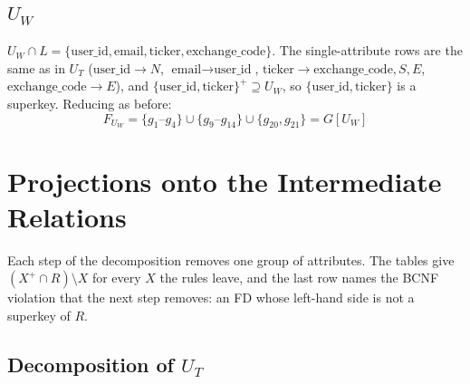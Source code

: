 \documentclass{article}
\newcommand{\at}[1]{\text{#1}}
\newcommand{\cl}[1]{\{#1\}^+}
\newcommand{\gr}[2]{g_{#1}\text{--}g_{#2}}
\begin{document}
\subsection{$U_W$}

$U_W \cap L = \{\at{user\_id}, \at{email}, \at{ticker}, \at{exchange\_code}\}$. The single-attribute rows are the same as in $U_T$ ($\at{user\_id} \rightarrow N$, $\at{email} \rightarrow \at{user\_id}$, $\at{ticker} \rightarrow \at{exchange\_code}, S, E$, $\at{exchange\_code} \rightarrow E$), and $\cl{\at{user\_id}, \at{ticker}} \supseteq U_W$, so $\{\at{user\_id}, \at{ticker}\}$ is a superkey. Reducing as before:
\[
  F_{U_W} = \{\gr{1}{4}\} \cup \{\gr{9}{14}\} \cup \{g_{20}, g_{21}\} = G[U_W]
\]

\section{Projections onto the Intermediate Relations}

Each step of the decomposition removes one group of attributes. The tables give $(X^+ \cap R) \setminus X$ for every $X$ the rules leave, and the last row names the BCNF violation that the next step removes: an FD whose left-hand side is not a superkey of $R$.

\subsection{Decomposition of $U_T$}
\end{document}
